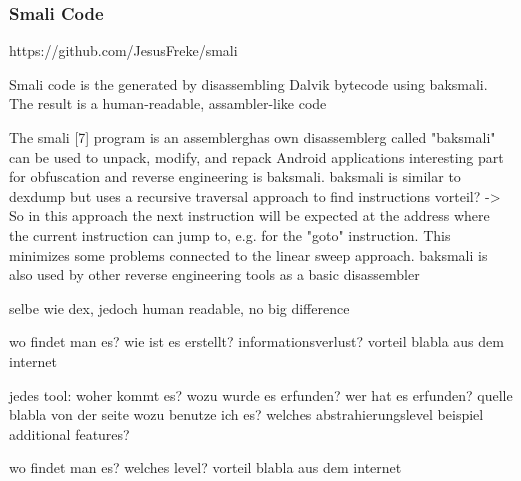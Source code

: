 \subsubsection{Smali Code}\label{subsubsection:tools-baksmali}
https://github.com/JesusFreke/smali

Smali code is the generated by disassembling Dalvik bytecode using baksmali. The result is a human-readable, assambler-like code

The smali [7] program is an \gls{assemblerg}has own \gls{disassemblerg} called "baksmali"\newline
can be used to unpack, modify, and repack Android applications\newline
interesting part for obfuscation and reverse engineering is baksmali. baksmali is similar to dexdump but uses a recursive traversal approach to find instructions\newline
vorteil? -> So in this approach the next instruction will be expected at the address where the current instruction can jump to, e.g. for the "goto" instruction. This minimizes some problems connected to the linear sweep approach. baksmali is also used by other reverse engineering tools as a basic disassembler\newline

selbe wie dex, jedoch human readable, no big difference

wo findet man es?\newline
wie ist es erstellt?\newline
informationsverlust?\newline
vorteil\newline
blabla aus dem internet\newline

jedes tool:\newline
woher kommt es?\newline
wozu wurde es erfunden?\newline
wer hat es erfunden? quelle\newline
blabla von der seite\newline
wozu benutze ich es?\newline
welches abstrahierungslevel\newline
beispiel\newline
additional features?\newline

wo findet man es?\newline
welches level?\newline
vorteil\newline
blabla aus dem internet\newline
